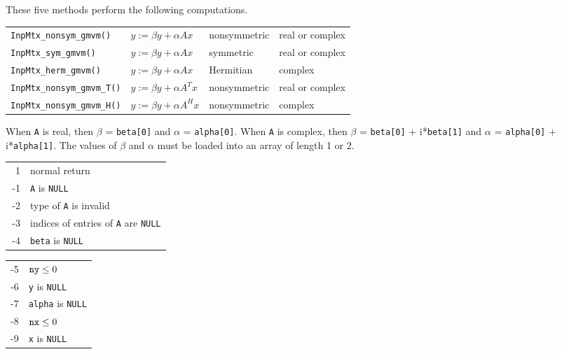 \begin{enumerate}
These five methods perform the following computations.
\begin{center}
\begin{tabular}{llll}
{\tt InpMtx\_nonsym\_gmvm()} 
   &  $y := \beta  y + \alpha  A  x$
   & nonsymmetric
   & real or complex \\
{\tt InpMtx\_sym\_gmvm()} 
   &  $y := \beta y + \alpha A x$
   & symmetric
   & real or complex \\
{\tt InpMtx\_herm\_gmvm()} 
   &  $y := \beta y + \alpha A x$
   & Hermitian
   & complex \\
{\tt InpMtx\_nonsym\_gmvm\_T()} 
   &  $y := \beta y + \alpha A^T x$
   & nonsymmetric
   & real or complex \\
{\tt InpMtx\_nonsym\_gmvm\_H()} 
   &  $y := \beta y + \alpha A^H x$
   & nonsymmetric
   & complex 
\end{tabular}
\end{center}
When {\tt A} is real, 
then $\beta$ = {\tt beta[0]}
and $\alpha$ = {\tt alpha[0]}.
When {\tt A} is complex, 
then $\beta$ = {\tt beta[0]} + i*{\tt beta[1]}
and $\alpha$ = {\tt alpha[0]} + i*{\tt alpha[1]}.
The values of $\beta$ and $\alpha$ 
must be loaded into an array of length 1 or 2.
\par {}
\begin{center}
\begin{tabular}[t]{rl}
~1 & normal return \\
-1 & {\tt A} is {\tt NULL} \\
-2 & type of {\tt A} is invalid \\
-3 & indices of entries of {\tt A} are {\tt NULL} \\
-4 & {\tt beta} is {\tt NULL} \\
\end{tabular}
\begin{tabular}[t]{rl}
-5 & ${\tt ny} \le 0$ \\
-6 & {\tt y} is {\tt NULL} \\
-7 & {\tt alpha} is {\tt NULL} \\
-8 & ${\tt nx} \le 0$ \\
-9 & {\tt x} is {\tt NULL} \\
\end{tabular}
\end{center}
\end{enumerate}
\par
